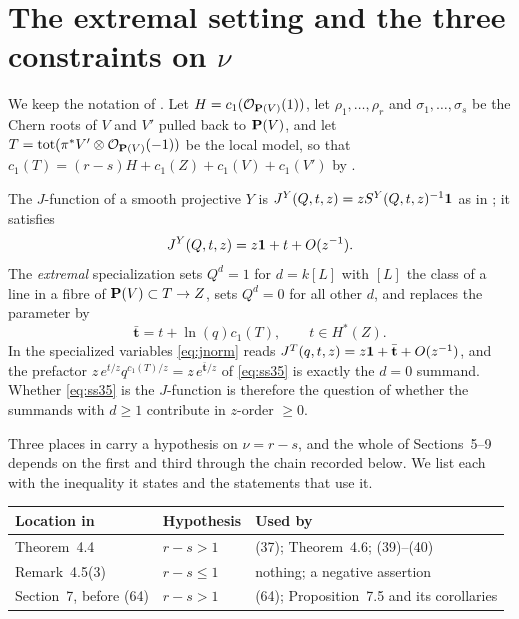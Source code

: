 \section{The extremal setting and the three constraints on \texorpdfstring{\(\nu\)}{nu}}
\label{sec:hypotheses}

We keep the notation of \cite{SS}.  Let \(H=c_{1}(\mathcal
O_{\mathbf P(V)}(1))\), let \(\rho_{1},\dots,\rho_{r}\) and
\(\sigma_{1},\dots,\sigma_{s}\) be the Chern roots of \(V\) and \(V'\)
pulled back to \(\mathbf P(V)\), and let
\(T=\mathrm{tot}(\pi^{*}V'\otimes\mathcal O_{\mathbf P(V)}(-1))\) be the local
model, so that \(c_{1}(T)=(r-s)H+c_{1}(Z)+c_{1}(V)+c_{1}(V')\) by
\cite[(32)]{SS}.

The \(J\)-function of a smooth projective \(Y\) is
\(J^{Y}(Q,t,z)=zS^{Y}(Q,t,z)^{-1}\mathbf 1\) as in \cite[(20)]{SS}; it satisfies
\begin{equation}
  \label{eq:jnorm}
  J^{Y}(Q,t,z)=z\mathbf 1+t+O(z^{-1}).
\end{equation}
The \emph{extremal} specialization \cite[(28) and~(33)]{SS} sets \(Q^{d}=1\)
for \(d=k[L]\) with \([L]\) the class of a line in a fibre of
\(\mathbf P(V)\subset T\to Z\), sets \(Q^{d}=0\) for all other \(d\), and replaces
the parameter by
\begin{equation}
  \label{eq:barparam}
  \bar{\mathbf t}=t+\ln(q)c_{1}(T),\qquad t\in H^{*}(Z).
\end{equation}
In the specialized variables \eqref{eq:jnorm} reads
\(J^{T}(q,t,z)=z\mathbf 1+\bar{\mathbf t}+O(z^{-1})\), and the prefactor
\(z\,e^{t/z}q^{c_{1}(T)/z}=z\,e^{\bar{\mathbf t}/z}\) of \eqref{eq:ss35} is
exactly the \(d=0\) summand.  Whether \eqref{eq:ss35} is the \(J\)-function
is therefore the question of whether the summands with \(d\ge1\) contribute
in \(z\)-order \(\ge0\).

Three places in \cite{SS} carry a hypothesis on \(\nu=r-s\), and the
whole of Sections~5--9 depends on the first and third through the chain
recorded below.  We list each with the inequality it states and the
statements that use it.

\begin{center}
\begin{tabular}{@{}lll@{}}
\hline
Location in \cite{SS} & Hypothesis & Used by\\
\hline
Theorem~4.4 & \(r-s>1\) & (37); Theorem~4.6; (39)--(40)\\
Remark~4.5(3) & \(r-s\le1\) & nothing; a negative assertion\\
Section~7, before (64) & \(r-s>1\) & (64); Proposition~7.5 and its corollaries\\
\hline
\end{tabular}
\end{center}

